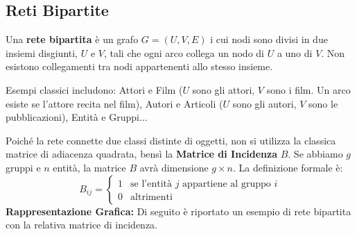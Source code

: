 \subsection{Reti Bipartite}
Una \textbf{rete bipartita} è un grafo $G=(U,V,E)$ i cui nodi sono divisi in due insiemi disgiunti, $U$ e $V$, tali che ogni arco collega un nodo di $U$ a uno di $V$. Non esistono collegamenti tra nodi appartenenti allo stesso insieme.

Esempi classici includono: Attori e Film ($U$ sono gli attori, $V$ sono i film. Un arco esiste se l'attore recita nel film), Autori e Articoli ($U$ sono gli autori, $V$ sono le pubblicazioni), Entità e Gruppi...


\noindent Poiché la rete connette due classi distinte di oggetti, non si utilizza la classica matrice di adiacenza quadrata, bensì la \textbf{Matrice di Incidenza} $B$.
Se abbiamo $g$ gruppi e $n$ entità, la matrice $B$ avrà dimensione $g \times n$.
La definizione formale è:
\begin{equation}
B_{ij} = 
\begin{cases} 
1 & \text{se l'entità } j \text{ appartiene al gruppo } i \\
0 & \text{altrimenti}
\end{cases}
\end{equation}
\textbf{Rappresentazione Grafica:}
Di seguito è riportato un esempio di rete bipartita con la relativa matrice di incidenza.

